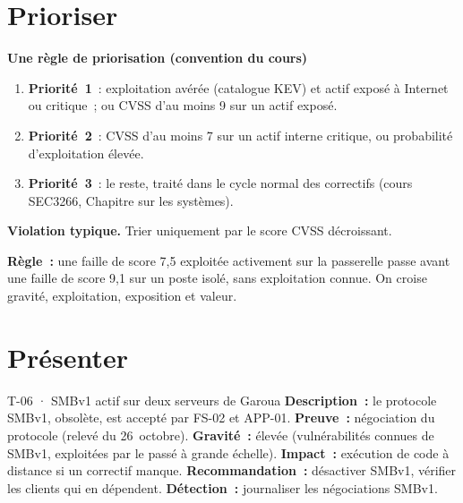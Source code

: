 \section{Prioriser}
\label{sec:c07-prioriser}

\begin{boxprocedure}
\textbf{Une règle de priorisation (convention du cours)}
\begin{enumerate}
    \item \textbf{Priorité~1}~: exploitation avérée (catalogue KEV) et actif
          exposé à Internet ou critique~; ou CVSS d'au moins 9 sur un actif
          exposé.
    \item \textbf{Priorité~2}~: CVSS d'au moins 7 sur un actif interne
          critique, ou probabilité d'exploitation élevée.
    \item \textbf{Priorité~3}~: le reste, traité dans le cycle normal des
          correctifs (cours SEC3266, Chapitre sur les systèmes).
\end{enumerate}
\end{boxprocedure}

\begin{boxalert}
\textbf{Violation typique.} Trier uniquement par le score CVSS décroissant.

\smallskip
\textbf{Règle~:} une faille de score 7,5 exploitée activement sur la
passerelle passe avant une faille de score 9,1 sur un poste isolé, sans
exploitation connue. On croise gravité, exploitation, exposition et valeur.
\end{boxalert}

\section{Présenter}
\label{sec:c07-presenter}

\begin{boxobjet}{T-06 · SMBv1 actif sur deux serveurs de Garoua}
\textbf{Description~:} le protocole SMBv1, obsolète, est accepté par
FS-02 et APP-01. \textbf{Preuve~:} négociation du protocole (relevé du
26~octobre). \textbf{Gravité~:} élevée (vulnérabilités connues de SMBv1,
exploitées par le passé à grande échelle). \textbf{Impact~:} exécution de
code à distance si un correctif manque. \textbf{Recommandation~:}
désactiver SMBv1, vérifier les clients qui en dépendent.
\textbf{Détection~:} journaliser les négociations SMBv1.
\end{boxobjet}

